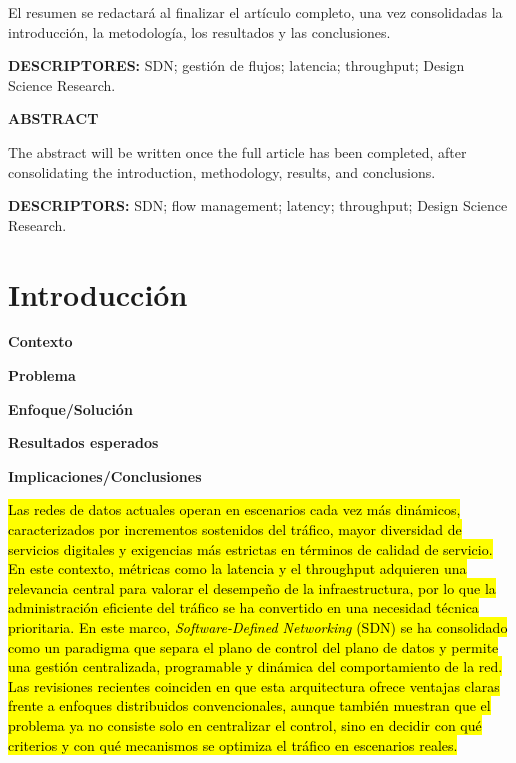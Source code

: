 \documentclass[12pt,a4paper]{article}
\newcommand{\introbox}[2]{%
    \colorbox{#1}{\strut\footnotesize\textbf{#2}}%
}
\newcommand{\introhl}[2]{%
    {\sethlcolor{#1}\hl{#2}}%
}
\begin{document}
El resumen se redactará al finalizar el artículo completo, una vez consolidadas la introducción, la metodología, los resultados y las conclusiones.

\textbf{DESCRIPTORES:} SDN; gestión de flujos; latencia; throughput; Design Science Research.

\vspace{0.5cm}

\textbf{ABSTRACT}

The abstract will be written once the full article has been completed, after consolidating the introduction, methodology, results, and conclusions.

\textbf{DESCRIPTORS:} SDN; flow management; latency; throughput; Design Science Research.

\vspace{0.6cm}

\section{Introducción}

\noindent
\introbox{introcontext}{Contexto}\hspace{0.2cm}
\introbox{introproblem}{Problema}\hspace{0.2cm}
\introbox{introsolution}{Enfoque/Solución}\hspace{0.2cm}
\introbox{introresults}{Resultados esperados}\hspace{0.2cm}
\introbox{introimp}{Implicaciones/Conclusiones}

\vspace{0.35cm}

\noindent
\introhl{introcontext}{Las redes de datos actuales operan en escenarios cada vez más dinámicos, caracterizados por incrementos sostenidos del tráfico, mayor diversidad de servicios digitales y exigencias más estrictas en términos de calidad de servicio. En este contexto, métricas como la latencia y el throughput adquieren una relevancia central para valorar el desempeño de la infraestructura, por lo que la administración eficiente del tráfico se ha convertido en una necesidad técnica prioritaria. En este marco, \textit{Software-Defined Networking} (SDN) se ha consolidado como un paradigma que separa el plano de control del plano de datos y permite una gestión centralizada, programable y dinámica del comportamiento de la red. Las revisiones recientes coinciden en que esta arquitectura ofrece ventajas claras frente a enfoques distribuidos convencionales, aunque también muestran que el problema ya no consiste solo en centralizar el control, sino en decidir con qué criterios y con qué mecanismos se optimiza el tráfico en escenarios reales.} \parencite{survey_ai_sdn, openflow_review}
\end{document}
